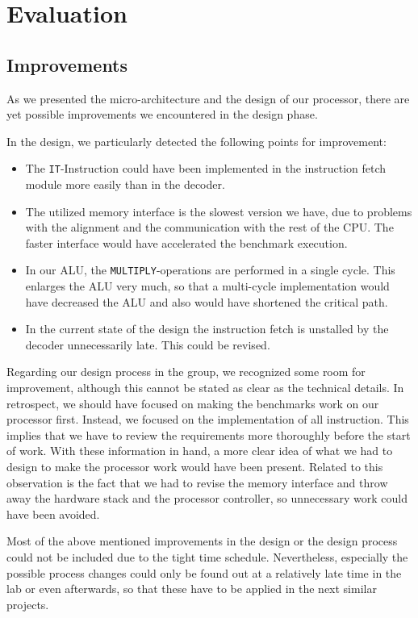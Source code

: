\chapter{Evaluation}
\label{cha:evaluation}

\section{Improvements}
\label{sec:improvements}
As we presented the micro-architecture and the design of our processor, there are yet possible improvements we encountered in the design phase. 

In the design, we particularly detected the following points for improvement:
\begin{itemize}
\item The \texttt{IT}-Instruction could have been implemented in the instruction fetch module more easily than in the decoder.
\item The utilized memory interface is the slowest version we have, due to problems with the alignment and the communication with the rest of the CPU. The faster interface would have accelerated the benchmark execution.
\item In our ALU, the \texttt{MULTIPLY}-operations are performed in a single cycle. This enlarges the ALU very much, so that a multi-cycle implementation would have decreased the ALU and also would have shortened the critical path.
\item In the current state of the design the instruction fetch is unstalled by the decoder unnecessarily late. This could be revised.
\end{itemize}

Regarding our design process in the group, we recognized some room for improvement, although this cannot be stated as clear as the technical details. In retrospect, we should have focused on making the benchmarks work on our processor first. Instead, we focused on the implementation of all instruction. This implies that we have to review the requirements more thoroughly before the start of work. With these information in hand, a more clear idea of what we had to design to make the processor work would have been present. Related to this observation is the fact that we had to revise the memory interface and throw away the hardware stack and the processor controller, so unnecessary work could have been avoided.
 
Most of the above mentioned improvements in the design or the design process  could not be included due to the tight time schedule. Nevertheless, especially the possible process changes could only be found out at a relatively late time in the lab or even afterwards, so that these have to be  applied in the next similar projects.

